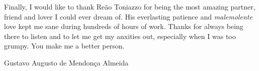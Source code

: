 \begin{acknowledgements}
\bigskip
Finally, I would like to thank Re\~ao Toniazzo for being the most amazing partner, friend and lover I could ever dream of. His everlasting patience and \emph{malemolente} love kept me sane during hundreds of hours of work. Thanks for always being there to listen and to let me get my anxities out, especially when I was too grumpy. You make me a better person. 

\vfill
Gustavo Augusto de Mendon\c{c}a Almeida
\end{acknowledgements}
